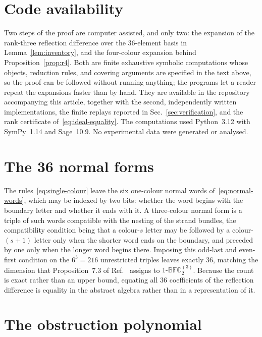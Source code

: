 \documentclass[
  aps,pre,
  reprint,
  superscriptaddress,
  amsmath,amssymb,
  floatfix
]{revtex4-2}
\theoremstyle{plain}
\theoremstyle{definition}
\theoremstyle{remark}
\newcommand{\BFCthree}{1\text{-}\mathbb{BFC}^{(3)}_2}
\begin{document}
\section*{Code availability}

Two steps of the proof are computer assisted, and only two: the expansion of
the rank-three reflection difference over the $36$-element basis in
Lemma~\ref{lem:inventory}, and the four-colour expansion behind
Proposition~\ref{prop:r4}. Both are finite exhaustive symbolic computations
whose objects, reduction rules, and covering arguments are specified in the
text above, so the proof can be followed without running anything; the programs
let a reader repeat the expansions faster than by hand. They are available in
the repository accompanying this article, together with the second,
independently written implementations, the finite replays reported in
Sec.~\ref{sec:verification}, and the rank certificate
of~\eqref{eq:ideal-equality}. The computations used Python~3.12 with SymPy~1.14
and Sage~10.9. No experimental data were generated or analysed.

\appendix

\section{The 36 normal forms}
\label{app:normal-forms}

The rules~\eqref{eq:single-colour} leave the six one-colour normal words
of~\eqref{eq:normal-words}, which may be indexed by two bits: whether the word
begins with the boundary letter and whether it ends with it. A three-colour
normal form is a triple of such words compatible with the nesting of the strand
bundles, the compatibility condition being that a colour-$s$ letter may be
followed by a colour-$(s+1)$ letter only when the shorter word ends on the
boundary, and preceded by one only when the longer word begins there. Imposing
this odd-last and even-first condition on the $6^3=216$ unrestricted triples
leaves exactly $36$, matching the dimension that Proposition~7.3 of
Ref.~\cite{shigechi2025fuss} assigns to $\BFCthree$. Because the count is exact rather than an upper
bound, equating all $36$ coefficients of the reflection difference is equality
in the abstract algebra rather than in a representation of it.

\section{The obstruction polynomial}
\label{app:obstruction}
\end{document}
